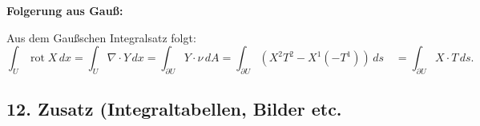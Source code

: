 \textbf{Folgerung aus Gauß:}

Aus dem Gaußschen Integralsatz folgt:
\[
\int_U \operatorname{rot} X \, dx 
= \int_U \nabla \cdot Y \, dx 
= \int_{\partial U} Y \cdot \nu \, dA 
= \int_{\partial U} \left( X^2 T^2 - X^1 (-T^1) \right) \, ds \quad 
= \int_{\partial U} X \cdot T \, ds.
\]


\subsection{12. Zusatz (Integraltabellen, Bilder etc.}